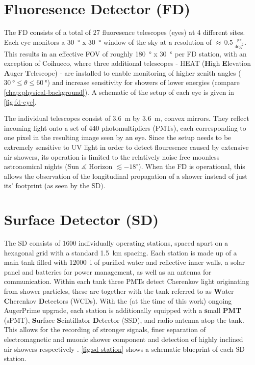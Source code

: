 \section{Fluoresence Detector (FD)}
\label{sec:fluoresence-detector}

The FD consists of a total of 27 fluoresence telescopes (eyes) at 4 different sites. Each eye monitors a \SI{30}{\degree} x \SI{30}{\degree} window of the sky at a
resolution of $\approx \, 0.5 \, \frac{ \text{px} }{ \text{deg}^2 }$. This results in an effective FOV of roughly \SI{180}{\degree} x \SI{30}{\degree} per FD 
station, with an exception of Coihueco, where three additional telescopes - HEAT (\textbf{H}igh \textbf{E}levation \textbf{A}uger \textbf{T}elescope) - are 
installed to enable monitoring of higher zenith angles ($\SI{30}{\degree}\leq\theta\leq\SI{60}{\degree}$) and increase sensitivity for showers of lower energies 
(compare \autoref{chap:physical-background}). A schematic of the setup of each eye is given in \autoref{fig:fd-eye}.

The individual telescopes consist of \SI{3.6}{\meter} by \SI{3.6}{\meter}, convex mirrors. They reflect incoming light onto a set of 440 photomultipliers (PMTs), 
each corresponding to one pixel in the resulting image seen by an eye. Since the setup needs to be extremely sensitive to UV light in order to detect flouresence 
caused by extensive air showers, its operation is limited to the relatively noise free moonless astronomical nights (Sun $\measuredangle$ Horizon 
$\lesssim-18^{\circ}$). When the FD is operational, this allows the observation of the longitudinal propagation of a shower instead of just its' footprint (as seen 
by the SD). 

\section{Surface Detector (SD)}
\label{sec:surface-detector}

The SD consists of 1600 individually operating stations, spaced apart on a hexagonal grid with a standard \SI{1.5}{\kilo\meter} spacing. Each 
station is made up of a main tank filled with \SI{12000}{\litre} of purified water and reflective inner walls, a solar panel and batteries for power management, 
as well as an antenna for communication. Within each tank three PMTs detect Cherenkov light originating from shower particles, these are together with the tank 
referred to as \textbf{W}ater \textbf{C}herenkov \textbf{D}etectors (WCDs). With the (at the time of this work) ongoing AugerPrime upgrade, each station is 
additionally equipped with a \textbf{s}mall \textbf{PMT} (sPMT), \textbf{S}urface \textbf{S}cintillator \textbf{D}etector (SSD), and radio antenna atop the tank.
This allows for the recording of stronger signals, finer separation of electromagnetic and muonic shower component and detection of highly inclined air showers 
respectively \cite{AugerPrime, horandel2019precision}. \autoref{fig:sd-station} shows a schematic blueprint of each SD station.

